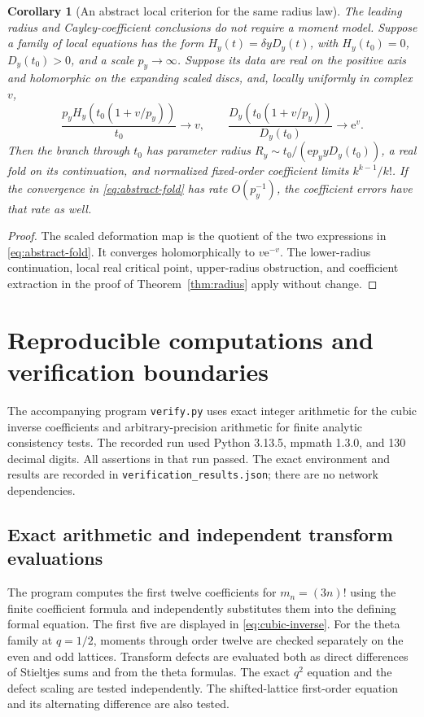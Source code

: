 \documentclass[11pt,a4paper]{article}
\numberwithin{equation}{section}
\newtheorem{corollary}[theorem]{Corollary}
\theoremstyle{definition}
\theoremstyle{remark}
\newcommand{\ee}{\mathrm e}
\begin{document}
\begin{corollary}[An abstract local criterion for the same radius law]
\label{cor:abstract}
The leading radius and Cayley-coefficient conclusions do not require a
moment model. Suppose a family of local equations has the form
\(H_y(t)=\delta yD_y(t)\), with \(H_y(t_0)=0\), \(D_y(t_0)>0\), and a
scale \(p_y\to\infty\). Suppose its data are real on the positive axis
and holomorphic on the expanding scaled discs, and, locally uniformly
in complex \(v\),
\begin{equation}
 \frac{p_yH_y(t_0(1+v/p_y))}{t_0}\longrightarrow v,
 \qquad
 \frac{D_y(t_0(1+v/p_y))}{D_y(t_0)}\longrightarrow\ee^v.
 \label{eq:abstract-fold}
\end{equation}
Then the branch through \(t_0\) has parameter radius
\(R_y\sim t_0/(\ee p_y yD_y(t_0))\), a real fold on its continuation,
and normalized fixed-order coefficient limits \(k^{k-1}/k!\).
If the convergence in \eqref{eq:abstract-fold} has rate \(O(p_y^{-1})\),
the coefficient errors have that rate as well.
\end{corollary}
\begin{proof}
The scaled deformation map is the quotient of the two expressions in
\eqref{eq:abstract-fold}. It converges holomorphically to \(v\ee^{-v}\).
The lower-radius continuation, local real critical point, upper-radius
obstruction, and coefficient extraction in the proof of
Theorem~\ref{thm:radius} apply without change.
\end{proof}

\section{Reproducible computations and verification boundaries}
\label{sec:computations}

The accompanying program \texttt{verify.py} uses exact integer
arithmetic for the cubic inverse coefficients and arbitrary-precision
arithmetic for finite analytic consistency tests. The recorded run used
Python 3.13.5, mpmath 1.3.0, and 130 decimal digits. All assertions in
that run passed. The exact environment and results are recorded in
\texttt{verification\_results.json}; there are no network dependencies.

\subsection{Exact arithmetic and independent transform evaluations}
The program computes the first twelve coefficients for \(m_n=(3n)!\)
using the finite coefficient formula and independently substitutes them
into the defining formal equation. The first five are displayed in
\eqref{eq:cubic-inverse}. For the theta family at \(q=1/2\), moments
through order twelve are checked separately on the even and odd
lattices. Transform defects are evaluated both as direct differences of
Stieltjes sums and from the theta formulas. The exact \(q^2\) equation
and the defect scaling are tested independently. The shifted-lattice
first-order equation and its alternating difference are also tested.
\end{document}
